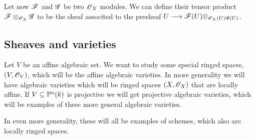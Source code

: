 \begin{definition}
Let now $\F$ and $\G$ be two $\O_X$ modules. We can define their tensor product $\F\otimes_{\O_X}\G$ to be the sheaf associted to the presheaf $U\longrightarrow \F(U)\otimes_{\O_X(U)\G(U)}$. 
\end{definition}



\subsection{Sheaves and varieties}

Let $V$ be an affine algebraic set. We want to study some special ringed spaces, $(V, \O_V)$, which will be the affine algebraic varieties. In more generality we will have algebraic varieties which will be ringed spaces $(X, \O_X)$ that are locally affine. If $V\subseteq \P^n(k)$ is projective we will get projective algebraic varieties, which will be examples of these more general algebraic varieties. 

In even more generality, these will all be examples of schemes, which also are locally ringed spaces. 